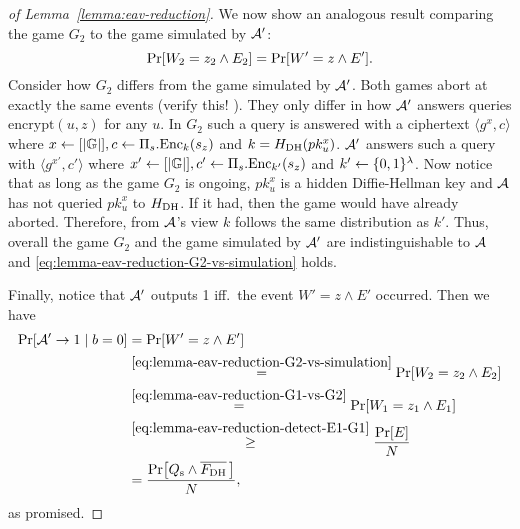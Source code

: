 \begin{proof}[of Lemma~\ref{lemma:eav-reduction}]
	We now show an analogous result comparing the game $G_2$ to the game simulated by $\mathcal{A}'$:
	\begin{equation} \label{eq:lemma-eav-reduction-G2-vs-simulation}
		\pr{W_2 = z_2 \land E_2} = \pr{W' = z \land E'}.
	\end{equation}
	Consider how $G_2$ differs from the game simulated by $\mathcal{A}'$. Both games abort at exactly the same events (verify this! ). They only differ in how $\mathcal{A}'$ answers queries $\mathrm{encrypt}(u, z)$ for any $u$. In $G_2$ such a query is answered with a ciphertext $\langle g^x, c \rangle$ where $x \leftarrow [\lvert\mathbb{G}\rvert], c \leftarrow \Pi_s.\mathrm{Enc}_k(s_z)$ and $k = H_\mathrm{DH}(pk_u^x)$. $\mathcal{A}'$ answers such a query with $\langle g^{x'}, c' \rangle$ where $x' \leftarrow [\lvert\mathbb{G}\rvert], c' \leftarrow \Pi_s.\mathrm{Enc}_{k'}(s_z)$ and $k' \leftarrow \{0, 1\}^\lambda$. Now notice that as long as the game $G_2$ is ongoing, $pk_u^{x}$ is a hidden Diffie-Hellman key and $\mathcal{A}$ has not queried $pk_u^{x}$ to $H_\mathrm{DH}$. If it had, then the game would have already aborted. Therefore, from $\mathcal{A}$'s view $k$ follows the same distribution as $k'$. Thus, overall the game $G_2$ and the game simulated by $\mathcal{A}'$ are indistinguishable to $\mathcal{A}$ and \eqref{eq:lemma-eav-reduction-G2-vs-simulation} holds.

	Finally, notice that $\mathcal{A}'$ outputs 1 iff.\ the event $W' = z \land E'$ occurred. Then we have
	\begin{align*}
		\pr{\adv' \to 1 \mid b = 0} & = \pr{W' = z \land E'}                                                                 \\
		                            & \stackrel{\eqref{eq:lemma-eav-reduction-G2-vs-simulation}}{=} \pr{W_2 = z_2 \land E_2} \\
		                            & \stackrel{\eqref{eq:lemma-eav-reduction-G1-vs-G2}}{=}  \pr{W_1 = z_1 \land E_1}        \\
		                            & \stackrel{\eqref{eq:lemma-eav-reduction-detect-E1-G1}}{\ge} \frac{\pr{E}}{N}           \\
		                            & = \frac{\pr{\qs \land \overline{\fdh}\,}}{N},
	\end{align*}
	as promised.


\end{proof}
